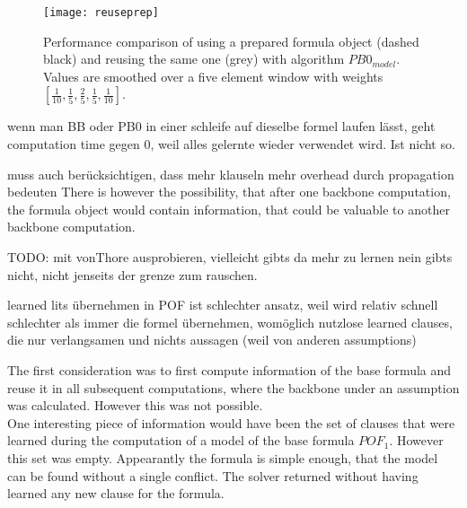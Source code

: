 \begin{figure}[h]
\centering
\texttt{[image: reuseprep]}
\caption[Performance comparison of using a prepared formula object and reusing the same one.]{Performance comparison of using a prepared formula object (dashed black) and reusing the same one (grey) with algorithm $PB0_{model}$. Values are smoothed over a five element window with weights $[\frac{1}{10},\frac{1}{5},\frac{2}{5},\frac{1}{5},\frac{1}{10}]$.}
\label{fig:reusePrep}
\end{figure}



\iffalse



wenn man BB oder PB0 in einer schleife auf dieselbe formel laufen lässt, geht computation time gegen 0, weil alles gelernte wieder verwendet wird. Ist nicht so.

muss auch berücksichtigen, dass mehr klauseln mehr overhead durch propagation bedeuten
There is however the possibility, that after one backbone computation, the formula object would contain information, that could be valuable to another backbone computation.

TODO: mit vonThore ausprobieren, vielleicht gibts da mehr zu lernen nein gibts nicht, nicht jenseits der grenze zum rauschen.








learned lits übernehmen in POF ist schlechter ansatz, weil wird relativ schnell schlechter als immer die formel übernehmen, womöglich nutzlose learned clauses, die nur verlangsamen und nichts aussagen (weil von anderen assumptions)



The first consideration was to first compute information of the base formula and reuse it in all subsequent computations, where the backbone under an assumption was calculated. However this was not possible.\\
One interesting piece of information would have been the set of clauses that were learned during the computation of a model of the base formula $POF_1$. However this set was empty. Appearantly the formula is simple enough, that the model can be found without a single conflict. The solver returned without having learned any new clause for the formula.


